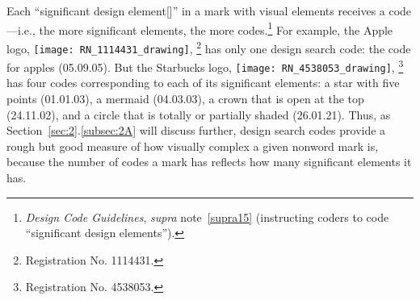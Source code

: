 \documentclass[letterpaper, 11pt, oneside]{article}
\begin{document}
Each ``significant design element[]'' in a mark with visual elements receives a code—i.e., the more significant elements, the more codes.\footnote{\textit{Design Code Guidelines}, \textit{supra} note~\ref{supra15} (instructing coders to code ``significant design elements'').} For example, the Apple logo, \texttt{[image: RN\_1114431\_drawing]}, \footnote{Registration No. 1114431.} has only one design search code: the code for apples (05.09.05). But the Starbucks logo, \texttt{[image: RN\_4538053\_drawing]}, \footnote{Registration No. 4538053.} has four codes corresponding to each of its significant elements: a star with five points (01.01.03), a mermaid (04.03.03), a crown that is open at the top (24.11.02), and a circle that is totally or partially shaded (26.01.21). Thus, as Section~\ref{sec:2}.\ref{subsec:2A} will discuss further, design search codes provide a rough but good measure of how visually complex a given nonword mark is, because the number of codes a mark has reflects how many significant elements it has.
\end{document}
